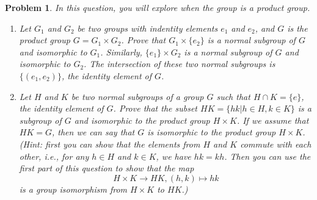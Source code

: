 \documentclass{article}
\newtheorem{ex}{Problem}
\begin{document}
\begin{ex}
In this question, you will explore when the group is a product group. 
\begin{enumerate}
    \item Let $G_1$ and $G_2$ be two groups with indentity elements $e_1$ and $e_2$, and $G$ is the product group $G=G_1\times G_2$. Prove that $G_1\times \{e_2\}$ is a normal subgroup of $G$ and isomorphic to $G_1$. Similarly, $\{e_1\}\times G_2$ is a normal subgroup of $G$ and isomorphic to $G_2$. The intersection of these two normal subgroups is $\{(e_1,e_2)\}$, the identity element of $G$.
    
    \item Let $H$ and $K$ be two normal subgroups of a group $G$ such that $H\cap K=\{e\}$, the identity element of $G$. Prove that the subset $HK=\{hk\vert h\in H, k\in K\}$ is a subgroup of $G$ and isomorphic to the product group $H\times K$. If we assume that $HK=G$, then we can say that $G$ is isomorphic to the product group $H\times K$. (Hint: first you can show that the elements from $H$ and $K$ commute with each other, i.e., for any $h\in H$ and $k\in K$, we have $hk=kh$. Then you can use the first part of this question to show that the map \[H\times K\to HK, (h,k)\mapsto hk\] is a group isomorphism from $H\times K$ to $HK$.)
\end{enumerate}

\end{ex}
\end{document}
